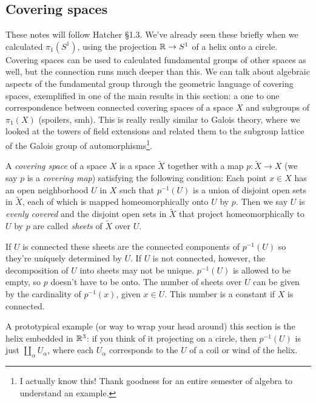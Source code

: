 \subsection{Covering spaces}
These notes will follow Hatcher \S 1.3.
\vspace{0.25cm}
\newline
We've already seen these briefly when we calculated $\pi_1(S^{1} )$, using the projection $\mathbb{R}\to S^{1} $ of a helix onto a circle. Covering spaces can be used to calculated fundamental groups of other spaces as well, but the connection runs much deeper than this. We can talk about algebraic aspects of the fundamental group through the geometric language of covering spaces, exemplified in one of the main results in this section: a one to one correspondence between connected covering spaces of a space $X$ and subgroups of $\pi_1(X)$ (spoilers, smh). This is really really similar to Galois theory, where we looked at the towers of field extensions and related them to the subgroup lattice of the Galois group of automorphisms\footnote{I actually know this! Thank goodness for an entire semester of algebra to understand an example.}.
\begin{definition}
A \emph{covering space} of a space $X$ is a space $\widetilde X$ together with a map $p \colon \widetilde X \to X$ (we say $p$ is a \emph{covering map}) satisfying the following condition: Each point $x\in X$ has an open neighborhood $U$ in $X$ such that $p^{-1}(U)$ is a union of disjoint open sets in $\widetilde X$, each of which is mapped homeomorphically onto $U$ by $p$. Then we say $U$ is \emph{evenly covered} and the disjoint open sets in $\widetilde X$ that project homeomorphically to $U$ by $p$ are called \emph{sheets} of $\widetilde X$ over $U$.
\end{definition}
If $U$ is connected these sheets are the connected components of $p^{-1}(U)$ so they're uniquely determined by $U$. If $U$ is not connected, however, the decomposition of $U$ into sheets may not be unique. $p ^{-1}(U)$ is allowed to be empty, so $p$ doesn't have to be onto. The number of sheets over $U$ can be given by the cardinality of $p ^{-1}(x)$, given $x\in U$. This number is a constant if $X$ is connected.
\begin{example}
A prototypical example (or way to wrap your head around) this section is the helix embedded in $\mathbb{R}^3$: if you think of it projecting on a circle, then $p^{-1}(U)$ is just $\amalg_{\alpha }U_{\alpha }$, where each $U_{\alpha }$ corresponds to the $U$ of a coil or wind of the helix.
\end{example}
